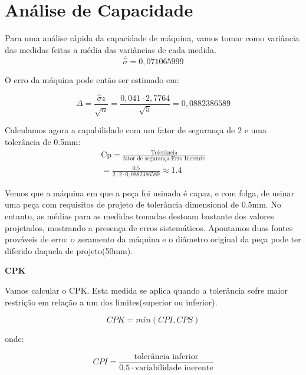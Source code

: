 \section{Análise de Capacidade}

Para uma análise rápida da capacidade de máquina, vamos tomar como variância das medidas feitas a média das variâncias de 
cada medida. 
\begin{equation}
	\overline{\widehat{\sigma}} =0,071065999
\end{equation}

O erro da máquina pode então ser estimado em:

\begin{equation}
\Delta = \frac{\widehat{\sigma}z}{\sqrt{n}}  = \frac{0,041 \cdot  2,7764}{\sqrt{5}} = 0,0882386589
\end{equation}

Calculamos agora a capabilidade com um fator de segurança de 2 e uma tolerância de 0.5mm:
\begin{equation}
\begin{array}{l}
 	\mbox{Cp} = \frac{\mbox{Tolerância}}{ \mbox{fator de segurança} \cdot \mbox{Erro Inerente}}  \\
 	= \frac{0.5}{2 \cdot 2 \cdot 0,0882386589} \approx 1.4
\end{array}
 \end{equation}
 
 Vemos que a máquina em que a peça foi usinada é capaz, e com folga, de usinar uma peça com requisitos de projeto de tolerância dimensional
 de 0.5mm. No entanto, as médias para as medidas tomadas destoam bastante dos valores projetados, mostrando a presença de
 erros sistemáticos. Apontamos duas fontes prováveis de erro: o zeramento da máquina e o diâmetro original da peça pode ter diferido
 daquela de projeto(50mm).
 
\textbf{CPK}


 Vamos calcular o CPK. Esta medida se aplica quando a tolerância sofre maior restrição em relação a um dos limites(superior ou inferior). 
 
 \begin{equation}
 	CPK = min(CPI, CPS)
 \end{equation}
 
 onde:
 
 \begin{equation}
 	CPI = \frac{\mbox{tolerância inferior}}{0.5 \cdot \mbox{variabilidade inerente}}
 \end{equation}
 

